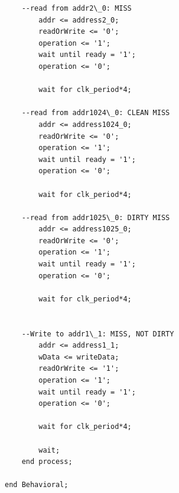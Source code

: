 \documentclass{article}
\begin{document}
\begin{lstlisting}
    --read from addr2\_0: MISS
        addr <= address2_0;
        readOrWrite <= '0';
        operation <= '1';
        wait until ready = '1';
        operation <= '0';
  
        wait for clk_period*4;

    --read from addr1024\_0: CLEAN MISS
        addr <= address1024_0;
        readOrWrite <= '0';
        operation <= '1';
        wait until ready = '1';
        operation <= '0';
        
        wait for clk_period*4;
        
    --read from addr1025\_0: DIRTY MISS
        addr <= address1025_0;
        readOrWrite <= '0';
        operation <= '1';
        wait until ready = '1';
        operation <= '0';
        
        wait for clk_period*4;
        
        
    --Write to addr1\_1: MISS, NOT DIRTY
        addr <= address1_1;
        wData <= writeData;
        readOrWrite <= '1';
        operation <= '1';
        wait until ready = '1';
        operation <= '0';
        
        wait for clk_period*4;
        
        wait;
    end process;

end Behavioral;
\end{lstlisting}
\end{document}
